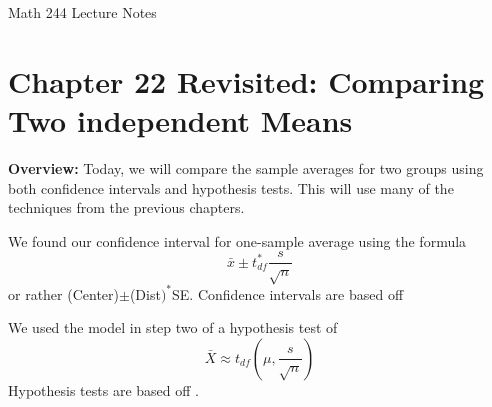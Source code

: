 \documentclass[12pt]{amsart}
\date{}
\theoremstyle{definition}
\begin{document}
\newcommand{\ph}{\phantom}
\newcommand{\ds}{\displaystyle}

\renewcommand{\emph}{\textbf}
\onehalfspace


\fancyhf{}   %
\renewcommand{\headrulewidth}{0.4pt} %
\fancyfootoffset[LE,LO]{0in}        %
\renewcommand{\footrulewidth}{0.4pt} %




\begin{center}

	\larger[3]	Math 244 Lecture Notes \smaller[3]		\\[22pt]

\end{center}

\section*{Chapter 22 Revisited: Comparing Two independent Means}




 \textbf{Overview:} Today, we will compare the sample averages for two groups using both confidence intervals and hypothesis tests. This will use many of the techniques from the previous chapters.
 ~\\
 
 \begin{framed}
  We found our confidence interval for one-sample average using the formula $$\bar{x}\pm t_{df}^* \frac{s}{\sqrt{n}}$$ or rather (Center)$\pm$(Dist$)^*$SE. Confidence intervals are based off \underline{\hspace{1in}}
 \end{framed}
 
\begin{framed}
We used the model in step two of a hypothesis test of $$\bar{X}\approx t_{df}\left(\mu, \frac{s}{\sqrt{n}}\right)$$ Hypothesis tests are based off \underline{\hspace{1in}}.
\end{framed}
\end{document}
